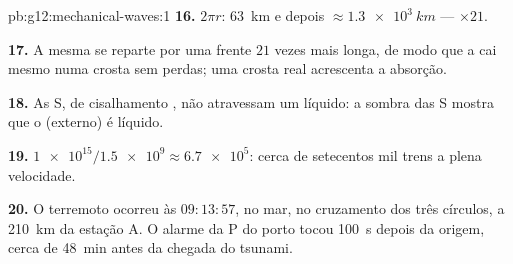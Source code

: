 \begin{solution}{pb:g12:mechanical-waves:1}
\textbf{16.} $2\pi r$: \qty{63}{km} e depois $\approx \qty{1.3e3}{km}$
--- $\times 21$.

\textbf{17.} A mesma  se reparte por uma frente $21$ vezes mais
longa, de modo que a  cai mesmo numa crosta sem perdas; uma
crosta real acrescenta a absorção.

\textbf{18.} As  S, de cisalhamento , não atravessam um
líquido: a sombra das  S mostra que o  (externo) é líquido.

\textbf{19.} $\num{1e15}/\num{1.5e9} \approx \num{6.7e5}$: cerca de
setecentos mil trens a plena velocidade.

\textbf{20.} O terremoto ocorreu às $09{:}13{:}57$, no mar, no cruzamento
dos três círculos, a \qty{210}{km} da estação A. O alarme da  P do
porto tocou \qty{100}{s} depois da origem, cerca de \qty{48}{min} antes
da chegada do tsunami.
\end{solution}
